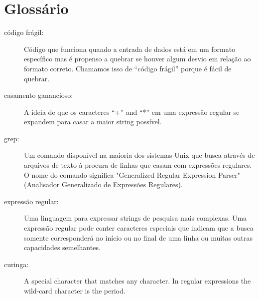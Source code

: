 \section{Glossário}

\begin{description}

\item[código frágil:]
Código que funciona quando a entrada de dados está em um formato específico mas é 
propenso a quebrar se houver algum desvio em relação ao formato correto. Chamamos isso
de ``código frágil'' porque é fácil de quebrar.

\item[casamento ganancioso:]
A ideia de que os caracteres ``+'' and ``*'' em uma expressão regular se expandem 
para casar a maior string possível.

\item[grep:]
Um comando disponível na maioria dos sistemas Unix que busca através de arquivos de texto à 
procura de linhas que casam com expressões regulares. O nome do comando significa "Generalized 
Regular Expression Parser" (Analisador Generalizado de Expressões Regulares).

\item[expressão regular:]
Uma linguagem para expressar strings de pesquisa mais complexas. Uma expressão regular pode
conter caracteres especiais que indicam que a busca somente corresponderá no início ou no final 
de uma linha ou muitas outras capacidades semelhantes.

\item[curinga:]
A special character that matches any character.  In regular expressions the wild-card
character is the period.


\end{description}

